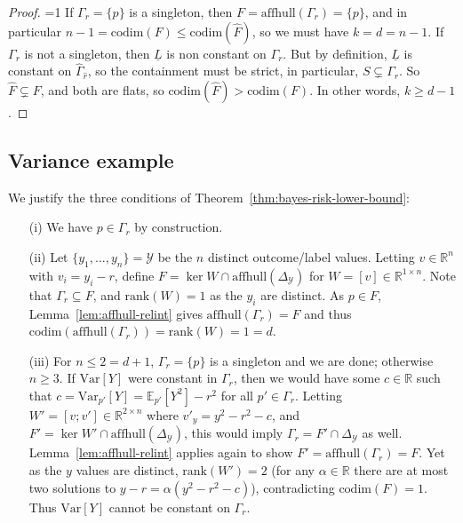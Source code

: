 \documentclass{article}
\newcommand{\Comments}{1}
\newcommand{\mytodo}[2]{\ifnum\Comments=1%
	\todo[linecolor=#1!80!black,backgroundcolor=#1,bordercolor=#1!80!black]{#2}\fi}
\newcommand{\btw}[1]{\mytodo{gray!10!white}{\textcolor{gray}{BTW: #1}}}%
\newcommand{\reals}{\mathbb{R}}
\newcommand{\simplex}{\Delta_\Y}
\newcommand{\codim}{\mathrm{codim}}
\newcommand{\rank}{\mathrm{rank}}
\newcommand{\affhull}{\mathrm{affhull}}
\newcommand{\E}{\mathbb{E}}
\newcommand{\Y}{\mathcal{Y}}
\newcommand{\lbar}{\underline{L}} %
\newcommand{\Var}{\mathrm{Var}}
\begin{document}
\begin{proof}
	\btw{Bo: reworked this part, hope you like the change.}
	If $\Gamma_r = \{p\}$ is a singleton, then $F = \affhull(\Gamma_r) = \{p\}$, and in particular $n-1 = \codim(F) \leq \codim(\hat F)$, so we must have $k=d=n-1$.
	If $\Gamma_r$ is not a singleton, then $\lbar$ is non constant on $\Gamma_r$.
	But by definition, $\lbar$ is constant on $\hat \Gamma_{\hat r}$, so the containment must be strict, in particular, $S \subsetneq \Gamma_r$.
	So $\hat F \subsetneq F$, and both are flats, so $\codim(\hat{F}) > \codim(F)$.
	In other words, $k \geq d-1$.	
\end{proof}

\subsection{Variance example}
\label{app:variance-example}
We justify the three conditions of Theorem~\ref{thm:bayes-risk-lower-bound}:
\begin{enumerate}
\item[(i)]
  We have $p\in\Gamma_r$ by construction.
\item[(ii)]
  Let $\{y_1,\ldots,y_n\} = \Y$ be the $n$ distinct outcome/label values.
  Letting $v\in\reals^n$ with $v_i = y_i - r$, define $F = \ker W \cap \affhull(\simplex)$ for $W = [v]\in\reals^{1\times n}$.
  Note that $\Gamma_r \subseteq F$, and $\rank(W) = 1$ as the $y_i$ are distinct.
  As $p\in F$, Lemma~\ref{lem:affhull-relint} gives $\affhull(\Gamma_r) = F$ and thus $\codim(\affhull(\Gamma_r)) = \rank(W) = 1 = d$.
\item[(iii)]
  For $n \leq 2 = d+1$, $\Gamma_r=\{p\}$ is a singleton and we are done; otherwise $n\geq 3$.
  If $\Var[Y]$ were constant in $\Gamma_r$, then we would have some $c\in\reals$ such that $c = \Var_{p'}[Y] = \E_{p'} [Y^2] - r^2$ for all $p'\in\Gamma_r$.
  Letting $W' = [v;v']\in\reals^{2\times n}$ where $v'_y = y^2-r^2-c$, and $F' = \ker W' \cap \affhull(\simplex)$, this would imply $\Gamma_r = F'\cap\simplex$ as well.
  Lemma~\ref{lem:affhull-relint} applies again to show $F' = \affhull(\Gamma_r) = F$.
  Yet as the $y$ values are distinct, $\rank(W')=2$ (for any $\alpha\in\reals$ there are at most two solutions to $y-r = \alpha(y^2-r^2-c)$), contradicting $\codim(F) = 1$.
  Thus $\Var[Y]$ cannot be constant on $\Gamma_r$.
\end{enumerate}
\end{document}
